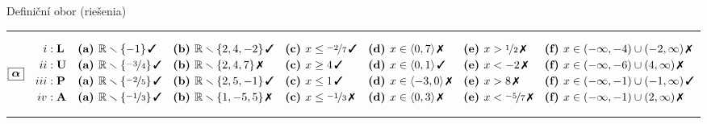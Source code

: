 \documentclass[10pt]{report}
\begin{document}
\begin{landscape}
\begin{center}
{\huge Definiční obor (riešenia)}\\[4mm]
\begin{varwidth}{\linewidth}
\begin{center}
\footnotesize
\rule[1mm]{\linewidth}{0.5pt}
$\boxed{\bm{\alpha}} \quad \begin{aligned}
\romannumeral1 : \; &\textbf{L} 
 &&\mathrm{\textbf{(a) }} \mathbb{R}\smallsetminus\{-1\}\,\text{\ding{51}}
 &&\mathrm{\textbf{(b) }} \mathbb{R}\smallsetminus\{2,4,-2\}\,\text{\ding{51}}
 &&\mathrm{\textbf{(c) }} x\leq\nicefrac{-2}{7}\,\text{\ding{51}}
 &&\mathrm{\textbf{(d) }} x\in\langle0 , 7\rangle\,\text{\ding{55}}
 &&\mathrm{\textbf{(e) }} x>\nicefrac{1}{2}\,\text{\ding{55}}
 &&\mathrm{\textbf{(f) }} x\in(-\infty , -4)\cup(-2 , \infty)\,\text{\ding{55}}
\\[-0.2mm]
\romannumeral2 : \; &\textbf{U} 
 &&\mathrm{\textbf{(a) }} \mathbb{R}\smallsetminus\{\nicefrac{-3}{4}\}\,\text{\ding{51}}
 &&\mathrm{\textbf{(b) }} \mathbb{R}\smallsetminus\{2,4,7\}\,\text{\ding{55}}
 &&\mathrm{\textbf{(c) }} x\geq4\,\text{\ding{51}}
 &&\mathrm{\textbf{(d) }} x\in\langle0 , 1\rangle\,\text{\ding{51}}
 &&\mathrm{\textbf{(e) }} x<-2\,\text{\ding{55}}
 &&\mathrm{\textbf{(f) }} x\in(-\infty , -6)\cup(4 , \infty)\,\text{\ding{55}}
\\[-0.2mm]
\romannumeral3 : \; &\textbf{P} 
 &&\mathrm{\textbf{(a) }} \mathbb{R}\smallsetminus\{\nicefrac{-2}{5}\}\,\text{\ding{51}}
 &&\mathrm{\textbf{(b) }} \mathbb{R}\smallsetminus\{2,5,-1\}\,\text{\ding{51}}
 &&\mathrm{\textbf{(c) }} x\leq1\,\text{\ding{51}}
 &&\mathrm{\textbf{(d) }} x\in\langle-3 , 0\rangle\,\text{\ding{55}}
 &&\mathrm{\textbf{(e) }} x>8\,\text{\ding{55}}
 &&\mathrm{\textbf{(f) }} x\in(-\infty , -1)\cup(-1 , \infty)\,\text{\ding{51}}
\\[-0.2mm]
\romannumeral4 : \; &\textbf{A} 
 &&\mathrm{\textbf{(a) }} \mathbb{R}\smallsetminus\{\nicefrac{-1}{3}\}\,\text{\ding{51}}
 &&\mathrm{\textbf{(b) }} \mathbb{R}\smallsetminus\{1,-5,5\}\,\text{\ding{55}}
 &&\mathrm{\textbf{(c) }} x\leq\nicefrac{-1}{3}\,\text{\ding{55}}
 &&\mathrm{\textbf{(d) }} x\in\langle0 , 3\rangle\,\text{\ding{55}}
 &&\mathrm{\textbf{(e) }} x<\nicefrac{-5}{7}\,\text{\ding{55}}
 &&\mathrm{\textbf{(f) }} x\in(-\infty , -1)\cup(2 , \infty)\,\text{\ding{55}}
\end{aligned} $
\\[2.6mm]
\rule[1.3mm]{\linewidth}{0.5pt}

\end{center}
\end{varwidth}
\end{center}
\end{landscape}
\end{document}
